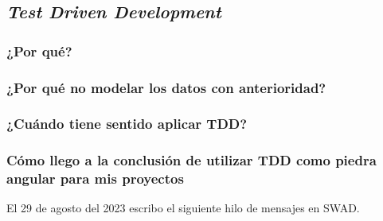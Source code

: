 \subsection{\textit{Test Driven Development}}


\subsubsection{¿Por qué?}

\subsubsection{¿Por qué no modelar los datos con anterioridad?}


\subsubsection{¿Cuándo tiene sentido aplicar TDD?}


\subsubsection{Cómo llego a la conclusión de utilizar TDD como piedra angular para mis proyectos}

El 29 de agosto del 2023 escribo el siguiente hilo de mensajes en SWAD.

